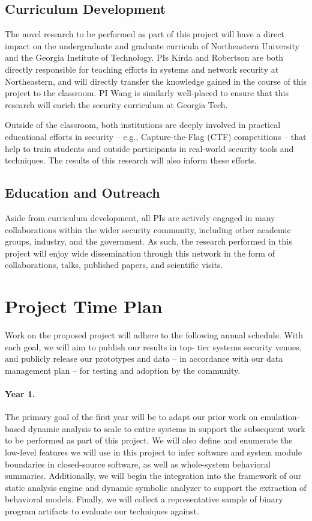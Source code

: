 \documentclass[letterpaper,twoside,11pt,headings=small]{scrartcl}
\begin{document}
\subsection{Curriculum Development}
\label{sec:impact:curriculum}

The novel research to be performed as part of this project will have a direct
impact on the undergraduate and graduate curricula of Northeastern University
and the Georgia Institute of Technology.  PIs Kirda and Robertson are both
directly responsible for teaching efforts in systems and network security at
Northeastern, and will directly transfer the knowledge gained in the course
of this project to the classroom.  PI Wang is similarly well-placed to ensure
that this research will enrich the security curriculum at Georgia Tech.

Outside of the classroom, both institutions are deeply involved in practical
educational efforts in security -- e.g., Capture-the-Flag (CTF) competitions --
that help to train students and outside participants in real-world security
tools and techniques.  The results of this research will also inform these
efforts.

\subsection{Education and Outreach}
\label{sec:impact:education}

Aside from curriculum development, all PIs are actively engaged in many
collaborations within the wider security community, including other academic
groups, industry, and the government.  As such, the research performed in this
project will enjoy wide dissemination through this network in the form of
collaborations, talks, published papers, and scientific visits.

\section{Project Time Plan}
\label{sec:time-plan}

Work on the proposed project will adhere to the following annual schedule.
With each goal, we will aim to publish our results in top- tier systems
security venues, and publicly release our prototypes and data -- in accordance
with our data management plan -- for testing and adoption by the community.

\paragraph{Year 1.} The primary goal of the first year will be to adapt our
prior work on emulation-based dynamic analysis to scale to entire systems in
support the subsequent work to be performed as part of this project. We will
also define and enumerate the low-level features we will use in this project
to infer software and system module boundaries in closed-source software, as
well as whole-system behavioral summaries. Additionally, we will begin the
integration into the framework of our static analysis engine and dynamic
symbolic analyzer to support the extraction of behavioral models.  Finally, we
will collect a representative sample of binary program artifacts to evaluate
our techniques against.
\end{document}
